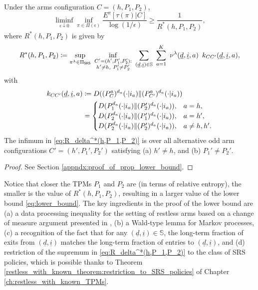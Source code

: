 \begin{prop}
	\label{prop:lower_bound}
	Under the arms configuration $C=(h, P_1, P_2)$,
	\begin{equation}
		\liminf\limits_{\epsilon\downarrow 0}\inf\limits_{\pi\in\Pi(\epsilon)}\frac{E^\pi[\tau(\pi)| C]}{\log(1/\epsilon)}\geq \frac{1}{R^*(h,P_1,P_2)},\label{eq:lower_bound}
	\end{equation}
	where $R^*(h,P_1,P_2)$ is given by
	\begingroup \allowdisplaybreaks\begin{align}
		R^*(h,P_1,P_2)
	\coloneqq \sup\limits_{\pi^\lambda\in\Pi_{\textsf{SRS}}}~ \inf\limits_{\substack{C'=(h', P_1', P_2'):\\h'\neq h,~P_1'\neq P_2'}} ~ \sum\limits_{(\underline{d},\underline{i})\in\mathbb{S}}~\sum\limits_{a=1}^{K}  ~\nu^\lambda(\underline{d},\underline{i},a) \,\textcolor{black}~{k_{CC'}(\underline{d}, \underline{i}, a)},\label{eq:R_delta^*(h,P_1,P_2)}
	\end{align}\endgroup
	with
	\begin{align}
		\textcolor{black}{k_{CC'}(\underline{d}, \underline{i}, a)} & \coloneqq D((P_C^a)^{d_a}(\cdot | i_a)\| (P_{C'}^a)^{d_a}(\cdot| i_a))\nonumber\\
		&= 
		\begin{cases}
			D(P_1^{d_a}(\cdot|i_a)\|(P_2')^{d_a}(\cdot|i_a)),&a=h,\\
			{D(P_2^{d_a}(\cdot|i_a)\|(P_1')^{d_a}(\cdot|i_a))},&a=h',\\
			D(P_2^{d_a}(\cdot|i_a)\|(P_2')^{d_a}(\cdot|i_a)),& a\neq h,h'.
		\end{cases}\label{eq:k(a,d_a,i_a)}
	\end{align}
The infimum in \eqref{eq:R_delta^*(h,P_1,P_2)} is over all alternative odd arm configurations $C'=(h', P_1', P_2')$ satisfying (a) $h'\neq h$, and (b) $P_1'\neq P_2'$.
\end{prop}
\begin{proof}
	See Section \ref{appndx:proof_of_prop_lower_bound}.
\end{proof}
Notice that closer the TPMs $P_1$ and $P_2$ are (in terms of relative entropy), the smaller is the value of $R^*(h, P_1, P_2)$, resulting in a larger value of the lower bound \eqref{eq:lower_bound}. The key ingredients in the proof of the lower bound are (a) a data processing inequality for the setting of restless arms based on a change of measure argument presented in \cite{Kaufmann2016}, (b) a Wald-type lemma for Markov processes, (c) a recognition of the fact that for any $(\underline{d}, \underline{i})\in \mathbb{S}$, the long-term fraction of exits from $(\underline{d}, \underline{i})$ matches the long-term fraction of entries to  $(\underline{d}, \underline{i})$, and (d) restriction of the supremum in \eqref{eq:R_delta^*(h,P_1,P_2)} to the class of SRS policies, which is possible thanks to Theorem \ref{restless_with_known_theorem:restriction_to_SRS_policies} of Chapter \ref{ch:restless_with_known_TPMs}.

